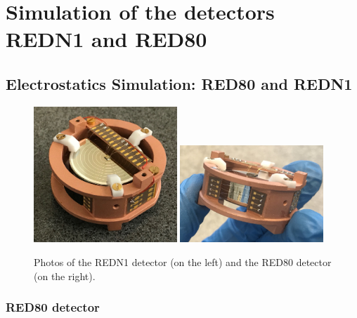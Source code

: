 
\chapter{Simulation of the detectors REDN1 and RED80} %

\label{ChapterElectrodesExperimental} %



\section{Electrostatics Simulation: RED80 and REDN1}

\begin{figure}
\centering
\includegraphics[align=c, width=0.48\textwidth]{Figures/ElectrodesExperimental/photo_redn1.jpg}
\includegraphics[align=c, width=0.48\textwidth]{Figures/ElectrodesExperimental/photo_red80.pdf}
\caption{Photos of the REDN1 detector (on the left) and the RED80 detector (on the right).}
\label{fig:photo-redn1-red80}
\end{figure}


\subsection{RED80 detector}

